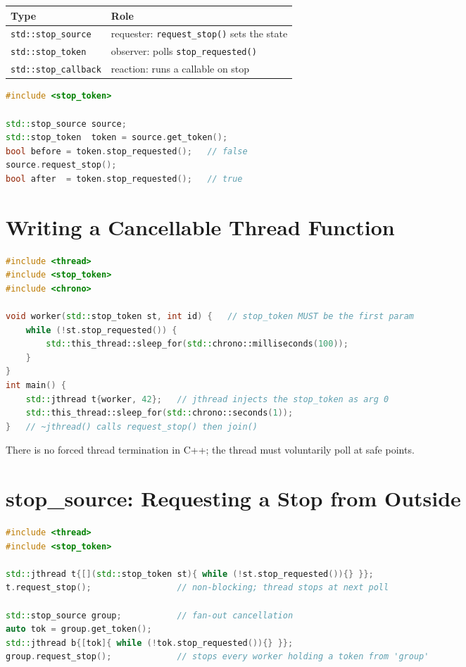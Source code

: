 \begin{center}
\begin{tabular}{ll}
\hline
\textbf{Type} & \textbf{Role} \\
\hline
\texttt{std::stop\_source} & requester: \texttt{request\_stop()} sets the state \\
\texttt{std::stop\_token} & observer: polls \texttt{stop\_requested()} \\
\texttt{std::stop\_callback} & reaction: runs a callable on stop \\
\hline
\end{tabular}
\end{center}

\begin{lstlisting}[language=C++,caption={How the three types share one stop-state}]
#include <stop_token>

std::stop_source source;
std::stop_token  token = source.get_token();
bool before = token.stop_requested();   // false
source.request_stop();
bool after  = token.stop_requested();   // true
\end{lstlisting}

\section{Writing a Cancellable Thread Function}
\label{sec:c20-jthread-cancellable}

\begin{lstlisting}[language=C++,caption={A cooperatively cancellable worker}]
#include <thread>
#include <stop_token>
#include <chrono>

void worker(std::stop_token st, int id) {   // stop_token MUST be the first param
    while (!st.stop_requested()) {
        std::this_thread::sleep_for(std::chrono::milliseconds(100));
    }
}
int main() {
    std::jthread t{worker, 42};   // jthread injects the stop_token as arg 0
    std::this_thread::sleep_for(std::chrono::seconds(1));
}   // ~jthread() calls request_stop() then join()
\end{lstlisting}

There is no forced thread termination in C++; the thread must voluntarily poll at safe points.

\section{stop\_source: Requesting a Stop from Outside}
\label{sec:c20-jthread-source}

\begin{lstlisting}[language=C++,caption={Explicit and external stop requests}]
#include <thread>
#include <stop_token>

std::jthread t{[](std::stop_token st){ while (!st.stop_requested()){} }};
t.request_stop();                 // non-blocking; thread stops at next poll

std::stop_source group;           // fan-out cancellation
auto tok = group.get_token();
std::jthread b{[tok]{ while (!tok.stop_requested()){} }};
group.request_stop();             // stops every worker holding a token from 'group'
\end{lstlisting}

